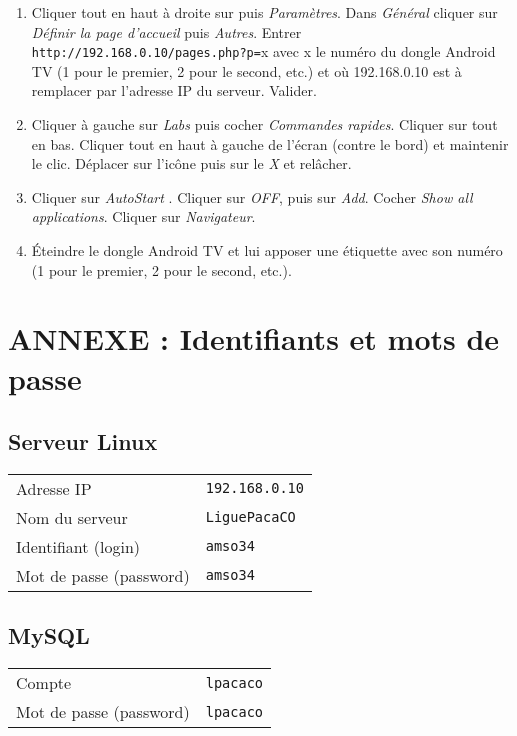 \documentclass[a4paper]{ffco-rapport}
\begin{document}
\begin{enumerate}
		\item Cliquer tout en haut à droite sur  puis \emph{Paramètres}.
					Dans \emph{Général} cliquer sur \emph{Définir la page d'accueil} puis \emph{Autres}. Entrer \texttt{http://192.168.0.10/pages.php?p=}x avec x le numéro du dongle Android TV (1 pour le premier, 2 pour le second, etc.) et où 192.168.0.10 est à remplacer par l'adresse IP du serveur. Valider.
		\item Cliquer à gauche sur \emph{Labs} puis cocher \emph{Commandes rapides}.
					Cliquer sur  tout en bas.
					Cliquer tout en haut à gauche de l'écran (contre le bord) et maintenir le clic. Déplacer sur l'icône  puis sur le \emph{X} et relâcher.
		\item Cliquer sur \emph{AutoStart} . Cliquer sur \emph{OFF}, puis sur \emph{Add}.
					Cocher \emph{Show all applications}. Cliquer sur \emph{Navigateur}.
		\item Éteindre le dongle Android TV et lui apposer une étiquette avec son numéro (1 pour le premier, 2 pour le second, etc.).
		
	\end{enumerate}

\chapter*{ANNEXE : Identifiants et mots de passe}

\section*{Serveur Linux}

\begin{tabular}{l|l}
	Adresse IP & \texttt{192.168.0.10}\\
	Nom du serveur & \texttt{LiguePacaCO}\\
	Identifiant (login) & \texttt{amso34}\\
	Mot de passe (password) & \texttt{amso34}\\
\end{tabular}


\section*{MySQL}

\begin{tabular}{l|l}
	Compte & \texttt{lpacaco}\\
	Mot de passe (password) & \texttt{lpacaco}\\
\end{tabular}
\end{document}
